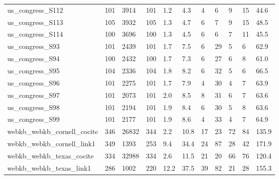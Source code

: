 \begin{longtable}{lllllllllll}
 us\_congress\_S112                                   & 101        & 3914      & 101   & 1.2    & 4.3    & 4     & 6      & 9      & 15     & 44.6    \\
 us\_congress\_S113                                   & 105        & 3932      & 105   & 1.3    & 4.7    & 6     & 7      & 9      & 15     & 48.5    \\
 us\_congress\_S114                                   & 100        & 3696      & 100   & 1.3    & 4.5    & 6     & 6      & 7      & 11     & 45.5    \\
 us\_congress\_S93                                    & 101        & 2439      & 101   & 1.7    & 7.5    & 6     & 29     & 5      & 6      & 62.9    \\
 us\_congress\_S94                                    & 100        & 2432      & 100   & 1.7    & 7.3    & 6     & 27     & 6      & 8      & 61.0    \\
 us\_congress\_S95                                    & 104        & 2336      & 104   & 1.8    & 8.2    & 6     & 32     & 5      & 6      & 66.5    \\
 us\_congress\_S96                                    & 101        & 2275      & 101   & 1.7    & 7.9    & 4     & 30     & 4      & 7      & 63.9    \\
 us\_congress\_S97                                    & 101        & 2073      & 101   & 2.0    & 8.5    & 8     & 31     & 6      & 7      & 63.6    \\
 us\_congress\_S98                                    & 101        & 2194      & 101   & 1.9    & 8.4    & 6     & 30     & 5      & 8      & 63.6    \\
 us\_congress\_S99                                    & 101        & 2177      & 101   & 1.9    & 8.6    & 4     & 33     & 4      & 7      & 64.9    \\
 webkb\_webkb\_cornell\_cocite                         & 346        & 26832     & 344   & 2.2    & 10.8   & 17    & 23     & 72     & 84     & 135.9   \\
 webkb\_webkb\_cornell\_link1                          & 349        & 1393      & 253   & 9.4    & 34.4   & 24    & 87     & 28     & 42     & 171.9   \\
 webkb\_webkb\_texas\_cocite                           & 334        & 32988     & 334   & 2.6    & 11.5   & 21    & 20     & 66     & 76     & 120.4   \\
 webkb\_webkb\_texas\_link1                            & 286        & 1002      & 220   & 12.2   & 37.5   & 39    & 82     & 21     & 28     & 155.3   \\

\end{longtable}
